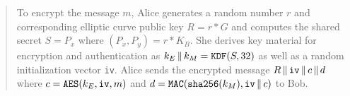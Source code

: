 \documentclass[12pt]{article}
\begin{document}
\begin{quote}
To encrypt the message $m$, Alice generates a random number $r$
and corresponding elliptic curve public key $R=r*G$ and computes the
shared secret $S=P_x$ where $(P_x,P_y)=r*K_B$.
She derives key material for encryption and authentication as
$k_E\,\|\,k_M=\text{\tt KDF}(S,32)$
as well as a random initialization vector \verb$iv$.
Alice sends the encrypted message $R\,\|\,\text{\tt iv}\,\|\,c\,\|\,d$
where $c=\text{\tt AES}(k_E,\text{\tt iv},m)$
and $d=\text{\tt MAC}(\text{\tt sha256}(k_M),\text{\tt iv}\,\|\,c)$ to Bob.
\end{quote}
\end{document}
